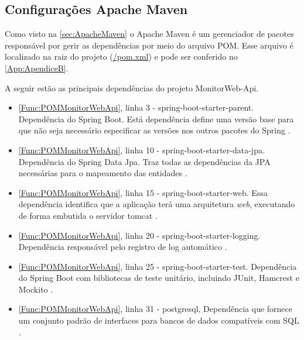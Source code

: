 \subsection{Configurações Apache Maven}\label{subsec:ConfiguraçõesApacheMaven}

Como visto na \autoref{sec:ApacheMaven} o Apache Maven é um gerenciador de pacotes responsável por gerir as dependências por meio do arquivo POM.
Esse arquivo é localizado na raiz do projeto (\url{/pom.xml}) e pode ser conferido no \autoref{App:ApendiceB}.

A seguir estão as principais dependências do projeto MonitorWeb-Api.

\begin{itemize}\label{List:Pom}
		\item \autoref{Func:POMMonitorWebApi}, linha 3 - spring-boot-starter-parent. Dependência do Spring Boot. Está dependência define uma versão base para que não seja necessário especificar as versões nos outros pacotes do Spring \cite{springBoot:2017}.
		
		\item \autoref{Func:POMMonitorWebApi}, linha 10 - spring-boot-starter-data-jpa. Dependência do Spring Data Jpa. Traz todas as dependências da JPA necessárias para o mapeamento das entidades \cite{springDataJpa:2017}.
		
		\item \autoref{Func:POMMonitorWebApi}, linha 15 - spring-boot-starter-web. Essa dependência identifica que a aplicação terá uma arquitetura \textit{web}, executando de forma embutida o servidor tomcat \cite{springBoot:2017}.
		
		\item \autoref{Func:POMMonitorWebApi}, linha 20 - spring-boot-starter-logging. Dependência responsável pelo registro de log automático \cite{springBoot:2017}.
		
		\item \autoref{Func:POMMonitorWebApi}, linha 25 - spring-boot-starter-test. Dependência do Spring Boot com bibliotecas de teste unitário, incluindo JUnit, Hamcrest e Mockito \cite{springBoot:2017}.
		
		\item \autoref{Func:POMMonitorWebApi}, linha 31 - postgresql, Dependência que fornece um conjunto padrão de interfaces para bancos de dados compatíveis com SQL \cite{PostgreSQL:2017}.
	
\end{itemize}


